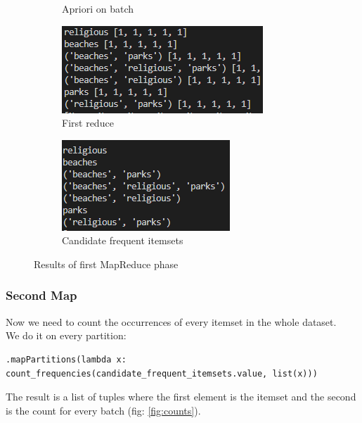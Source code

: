 \documentclass[a4paper]{article}
\begin{document}
\begin{figure}[h]
\begin{subfigure}[b]{0.24\textwidth}
         	\caption{Apriori on batch}
         	\label{fig:apriori}
		\end{subfigure}
		\hfill
		\begin{subfigure}[b]{0.24\textwidth}
			\centering
			\includegraphics[width=\textwidth]{grouped.PNG}
         	\caption{First reduce}
         	\label{fig:grouped}
		\end{subfigure}
		\hfill
		\begin{subfigure}[b]{0.24\textwidth}
			\centering
			\includegraphics[width=\textwidth]{candidates.PNG}
         	\caption{Candidate frequent itemsets}
         	\label{fig:candidate_fi}
		\end{subfigure}
	\caption{Results of first MapReduce phase}
	\end{figure}
	
	\subsubsection{Second Map}
	Now we need to count the occurrences of every itemset in the whole dataset.\\
	We do it on every partition:
	\begin{lstlisting}[numbers=none]
.mapPartitions(lambda x: count_frequencies(candidate_frequent_itemsets.value, list(x)))
\end{lstlisting}
	The result is a list of tuples where the first element is the itemset and the second is the count for every batch (fig: \ref{fig:counts}).
	
\end{document}
